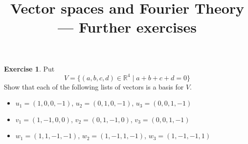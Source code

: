 \documentclass{amsart}
\title{Vector spaces and Fourier Theory --- Further exercises}
\newcommand{\R}         {{\mathbb{R}}}
\newcommand{\st}        {\;|\;}
\renewcommand{\:}{\colon}
\theoremstyle{definition}
\newtheorem{exercise}{Exercise}
\begin{document}
\maketitle


\begin{exercise}
 Put
 \[ V = \{(a,b,c,d)\in\R^4\st a+b+c+d=0\} \]
 Show that each of the following lists of vectors is a basis for
 $V$.
 \begin{itemize}
  \item $u_1=(1,0,0,-1)$, $u_2=(0,1,0,-1)$, $u_3=(0,0,1,-1)$
  \item $v_1=(1,-1,0,0)$, $v_2=(0,1,-1,0)$, $v_3=(0,0,1,-1)$
  \item $w_1=(1,1,-1,-1)$, $w_2=(1,-1,1,-1)$, $w_3=(1,-1,-1,1)$
 \end{itemize}
\end{exercise}
\end{document}
